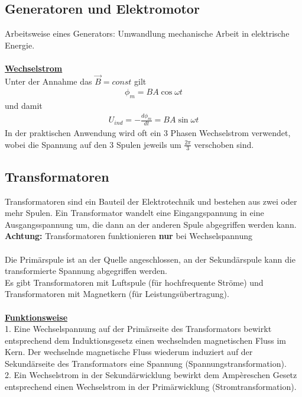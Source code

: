 \documentclass[a4paper,12pt]{report}
\begin{document}
\subsection{Generatoren und Elektromotor}

Arbeitsweise eines Generators: Umwandlung mechanische Arbeit in elektrische Energie. 
\\ \\
\underline{\textbf{Wechselstrom}} \\
Unter der Annahme das $\vec{B} = const $ gilt 
\begin{align}
\phi_m = BA \cos{\omega t} 
\end{align}
und damit 
\begin{align}
U_{ind} = - \frac{d\phi_m}{dt} = BA\sin{\omega t}
\end{align}
In der praktischen Anwendung wird oft ein 3 Phasen Wechselstrom verwendet, wobei die Spannung auf den 3 Spulen jeweils um $\frac{2\pi}{3}$ verschoben sind. 

\subsection{Transformatoren}

Transformatoren sind ein Bauteil der Elektrotechnik und bestehen aus zwei oder mehr Spulen. Ein Transformator wandelt eine Eingangspannung in eine Ausgangsspannung um, die dann an der anderen Spule abgegriffen werden kann. \textbf{Achtung:} Transformatoren funktionieren \textbf{nur} bei Wechselspannung \\ \\
Die Primärspule ist an der Quelle angeschlossen, an der Sekundärspule kann die transformierte Spannung abgegriffen werden. \\
Es gibt Transformatoren mit Luftspule (für hochfrequente Ströme) und Transformatoren mit Magnetkern (für Leistungsübertragung). \\ \\
\underline{\textbf{Funktionsweise}} \\
1. Eine Wechselspannung auf der Primärseite des Transformators bewirkt entsprechend dem Induktionsgesetz einen wechselnden magnetischen Fluss im Kern. Der wechselnde magnetische Fluss wiederum induziert auf der Sekundärseite des Transformators eine Spannung (Spannungstransformation). \\
2. Ein Wechselstrom in der Sekundärwicklung bewirkt dem Ampèreschen Gesetz entsprechend einen Wechselstrom in der Primärwicklung (Stromtransformation). \\
\end{document}
